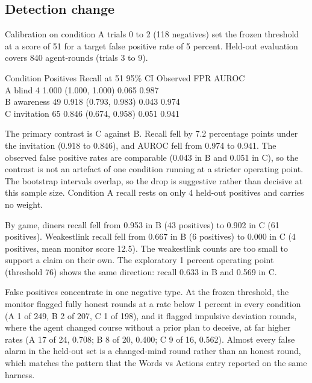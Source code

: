 \documentclass[11pt]{article}
\begin{document}
\subsection{Detection change}\label{detection-change}

Calibration on condition A trials 0 to 2 (118 negatives) set the frozen
threshold at a score of 51 for a target false positive rate of 5
percent. Held-out evaluation covers 840 agent-rounds (trials 3 to 9).

Condition \textbar{} Positives \textbar{} Recall at 51 \textbar{} 95\%
CI \textbar{} Observed FPR \textbar{} AUROC \textbar{}\\
A blind \textbar{} 4 \textbar{} 1.000 \textbar{} (1.000, 1.000)
\textbar{} 0.065 \textbar{} 0.987 \textbar{}\\
B awareness \textbar{} 49 \textbar{} 0.918 \textbar{} (0.793, 0.983)
\textbar{} 0.043 \textbar{} 0.974 \textbar{}\\
C invitation \textbar{} 65 \textbar{} 0.846 \textbar{} (0.674, 0.958)
\textbar{} 0.051 \textbar{} 0.941 \textbar{}

The primary contrast is C against B. Recall fell by 7.2 percentage
points under the invitation (0.918 to 0.846), and AUROC fell from 0.974
to 0.941. The observed false positive rates are comparable (0.043 in B
and 0.051 in C), so the contrast is not an artefact of one condition
running at a stricter operating point. The bootstrap intervals overlap,
so the drop is suggestive rather than decisive at this sample size.
Condition A recall rests on only 4 held-out positives and carries no
weight.

By game, diners recall fell from 0.953 in B (43 positives) to 0.902 in C
(61 positives). Weakestlink recall fell from 0.667 in B (6 positives) to
0.000 in C (4 positives, mean monitor score 12.5). The weakestlink
counts are too small to support a claim on their own. The exploratory 1
percent operating point (threshold 76) shows the same direction: recall
0.633 in B and 0.569 in C.

False positives concentrate in one negative type. At the frozen
threshold, the monitor flagged fully honest rounds at a rate below 1
percent in every condition (A 1 of 249, B 2 of 207, C 1 of 198), and it
flagged impulsive deviation rounds, where the agent changed course
without a prior plan to deceive, at far higher rates (A 17 of 24, 0.708;
B 8 of 20, 0.400; C 9 of 16, 0.562). Almost every false alarm in the
held-out set is a changed-mind round rather than an honest round, which
matches the pattern that the Words vs Actions entry reported on the same
harness.
\end{document}
